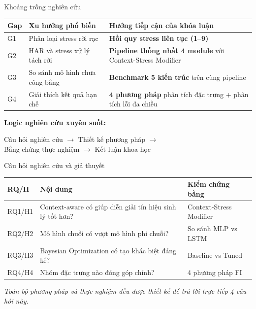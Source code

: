 \documentclass[11pt]{beamer}
\begin{document}
\begin{frame}{Khoảng trống nghiên cứu}
\small
\begin{table}[h]
\centering
\begin{tabular}{p{0.8cm}p{3.5cm}p{5.0cm}}
\toprule
\textbf{Gap} & \textbf{Xu hướng phổ biến} & \textbf{Hướng tiếp cận của khóa luận} \\
\midrule
G1 & Phân loại stress rời rạc & \textbf{Hồi quy stress liên tục (1--9)} \\
G2 & HAR và stress xử lý tách rời & \textbf{Pipeline thống nhất 4 module} với Context-Stress Modifier \\
G3 & So sánh mô hình chưa công bằng & \textbf{Benchmark 5 kiến trúc} trên cùng pipeline \\
G4 & Giải thích kết quả hạn chế & \textbf{4 phương pháp} phân tích đặc trưng + phân tích lỗi đa chiều \\
\bottomrule
\end{tabular}
\end{table}

\vspace{0.1cm}
\textbf{Logic nghiên cứu xuyên suốt:}
\begin{center}
\scriptsize
Câu hỏi nghiên cứu $\rightarrow$ Thiết kế phương pháp $\rightarrow$\\
Bằng chứng thực nghiệm $\rightarrow$ Kết luận khoa học
\end{center}
\end{frame}

\begin{frame}{Câu hỏi nghiên cứu và giả thuyết}
\small
\begin{table}[h]
\centering
\begin{tabular}{p{1.2cm}p{5.5cm}p{3.0cm}}
\toprule
\textbf{RQ/H} & \textbf{Nội dung} & \textbf{Kiểm chứng bằng} \\
\midrule
RQ1/H1 & Context-aware có giúp diễn giải tín hiệu sinh lý tốt hơn? & Context-Stress Modifier \\
RQ2/H2 & Mô hình chuỗi có vượt mô hình phi chuỗi? & So sánh MLP vs LSTM \\
RQ3/H3 & Bayesian Optimization có tạo khác biệt đáng kể? & Baseline vs Tuned \\
RQ4/H4 & Nhóm đặc trưng nào đóng góp chính? & 4 phương pháp FI \\
\bottomrule
\end{tabular}
\end{table}

\vspace{0.1cm}
\textit{Toàn bộ phương pháp và thực nghiệm đều được thiết kế để trả lời trực tiếp 4 câu hỏi này.}
\end{frame}
\end{document}
